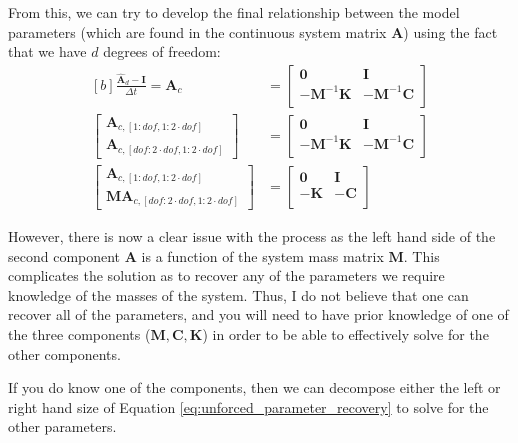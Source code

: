 \documentclass{article}
\begin{document}
From this, we can try to develop the final relationship between the model parameters (which are found in the continuous system matrix $\mathbf{A}$) using the fact that we have $d$ degrees of freedom:
\begin{equation}\label{eq:unforced_parameter_recovery}
\begin{aligned}[b]
\frac{\hat{\mathbf{A}}_d - \mathbf{I}}{\Delta t} =\mathbf{A}_c &= 
\begin{bmatrix}
\mathbf{0} & \mathbf{I} \\
-\mathbf{M}^{-1}\mathbf{K} & -\mathbf{M}^{-1}\mathbf{C} \\
\end{bmatrix} \\
\begin{bmatrix}
\mathbf{A}_{c, [1:dof, 1:2\cdot dof]} \\
\mathbf{A}_{c, [dof:2 \cdot dof, 1:2\cdot dof]}
\end{bmatrix}
&= \begin{bmatrix}
\mathbf{0} & \mathbf{I} \\
-\mathbf{M}^{-1}\mathbf{K} & -\mathbf{M}^{-1}\mathbf{C} \\
\end{bmatrix} \\
\begin{bmatrix}
\mathbf{A}_{c, [1:dof, 1:2\cdot dof]} \\
\mathbf{M} \mathbf{A}_{c, [dof:2 \cdot dof, 1:2\cdot dof]}
\end{bmatrix}
&= \begin{bmatrix}
\mathbf{0} & \mathbf{I} \\
-\mathbf{K} & -\mathbf{C} \\
\end{bmatrix}
\end{aligned}
\end{equation}

However, there is now a clear issue with the process as the left hand side of the second component $\mathbf{A}$ is a function of the system mass matrix $\mathbf{M}$. This complicates the solution as to recover any of the parameters we require knowledge of the masses of the system. Thus, I do not believe that one can recover all of the parameters, and you will need to have prior knowledge of one of the three components ($\mathbf{M}, \mathbf{C}, \mathbf{K}$) in order to be able to effectively solve for the other components.

If you do know one of the components, then we can decompose either the left or right hand size of Equation \eqref{eq:unforced_parameter_recovery} to solve for the other parameters.
\end{document}
